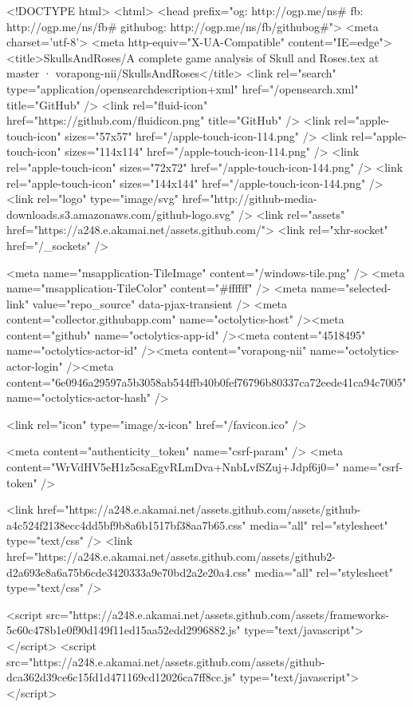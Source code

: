   


<!DOCTYPE html>
<html>
  <head prefix="og: http://ogp.me/ns# fb: http://ogp.me/ns/fb# githubog: http://ogp.me/ns/fb/githubog#">
    <meta charset='utf-8'>
    <meta http-equiv="X-UA-Compatible" content="IE=edge">
        <title>SkullsAndRoses/A complete game analysis of Skull and Roses.tex at master · vorapong-nii/SkullsAndRoses</title>
    <link rel="search" type="application/opensearchdescription+xml" href="/opensearch.xml" title="GitHub" />
    <link rel="fluid-icon" href="https://github.com/fluidicon.png" title="GitHub" />
    <link rel="apple-touch-icon" sizes="57x57" href="/apple-touch-icon-114.png" />
    <link rel="apple-touch-icon" sizes="114x114" href="/apple-touch-icon-114.png" />
    <link rel="apple-touch-icon" sizes="72x72" href="/apple-touch-icon-144.png" />
    <link rel="apple-touch-icon" sizes="144x144" href="/apple-touch-icon-144.png" />
    <link rel="logo" type="image/svg" href="http://github-media-downloads.s3.amazonaws.com/github-logo.svg" />
    <link rel="assets" href="https://a248.e.akamai.net/assets.github.com/">
    <link rel="xhr-socket" href="/_sockets" />
    


    <meta name="msapplication-TileImage" content="/windows-tile.png" />
    <meta name="msapplication-TileColor" content="#ffffff" />
    <meta name="selected-link" value="repo_source" data-pjax-transient />
    <meta content="collector.githubapp.com" name="octolytics-host" /><meta content="github" name="octolytics-app-id" /><meta content="4518495" name="octolytics-actor-id" /><meta content="vorapong-nii" name="octolytics-actor-login" /><meta content="6e0946a29597a5b3058ab544ffb40b0fef76796b80337ca72eede41ca94c7005" name="octolytics-actor-hash" />

    
    
    <link rel="icon" type="image/x-icon" href="/favicon.ico" />

    <meta content="authenticity_token" name="csrf-param" />
<meta content="WrVdHV5eH1z5csaEgvRLmDva+NnbLvfSZuj+Jdpf6j0=" name="csrf-token" />

    <link href="https://a248.e.akamai.net/assets.github.com/assets/github-a4c524f2138ecc4dd5bf9b8a6b1517bf38aa7b65.css" media="all" rel="stylesheet" type="text/css" />
    <link href="https://a248.e.akamai.net/assets.github.com/assets/github2-d2a693e8a6a75b6cde3420333a9e70bd2a2e20a4.css" media="all" rel="stylesheet" type="text/css" />
    


      <script src="https://a248.e.akamai.net/assets.github.com/assets/frameworks-5c60c478b1e0f90d149f11ed15aa52edd2996882.js" type="text/javascript"></script>
      <script src="https://a248.e.akamai.net/assets.github.com/assets/github-dca362d39ce6c15fd1d471169cd12026ca7ff8cc.js" type="text/javascript"></script>
      
